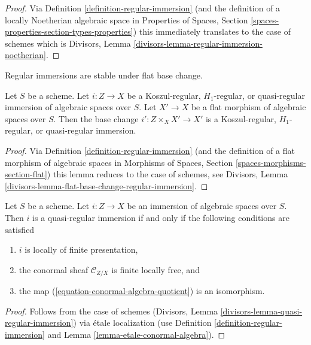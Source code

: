 \begin{proof}
Via Definition \ref{definition-regular-immersion}
(and the definition of a locally Noetherian algebraic space
in Properties of Spaces, Section
\ref{spaces-properties-section-types-properties})
this immediately translates to the case of schemes which is
Divisors, Lemma \ref{divisors-lemma-regular-immersion-noetherian}.
\end{proof}

\begin{lemma}
\label{lemma-flat-base-change-regular-immersion}
\begin{slogan}
Regular immersions are stable under flat base change.
\end{slogan}
Let $S$ be a scheme. Let $i : Z \to X$ be a Koszul-regular,
$H_1$-regular, or quasi-regular immersion of algebraic spaces over $S$.
Let $X' \to X$ be a flat morphism of algebraic spaces over $S$.
Then the base change $i' : Z \times_X X' \to X'$ is a Koszul-regular,
$H_1$-regular, or quasi-regular immersion.
\end{lemma}

\begin{proof}
Via Definition \ref{definition-regular-immersion}
(and the definition of a flat morphism of algebraic spaces
in Morphisms of Spaces, Section
\ref{spaces-morphisms-section-flat})
this lemma reduces to the case of schemes, see
Divisors, Lemma \ref{divisors-lemma-flat-base-change-regular-immersion}.
\end{proof}

\begin{lemma}
\label{lemma-quasi-regular-immersion}
Let $S$ be a scheme. Let $i : Z \to X$ be an immersion of algebraic spaces
over $S$. Then $i$ is a quasi-regular immersion if and only if the following
conditions are satisfied
\begin{enumerate}
\item $i$ is locally of finite presentation,
\item the conormal sheaf $\mathcal{C}_{Z/X}$ is finite locally free, and
\item the map (\ref{equation-conormal-algebra-quotient}) is an isomorphism.
\end{enumerate}
\end{lemma}

\begin{proof}
Follows from the case of schemes
(Divisors, Lemma \ref{divisors-lemma-quasi-regular-immersion})
via \'etale localization (use Definition \ref{definition-regular-immersion}
and
Lemma \ref{lemma-etale-conormal-algebra}).
\end{proof}

